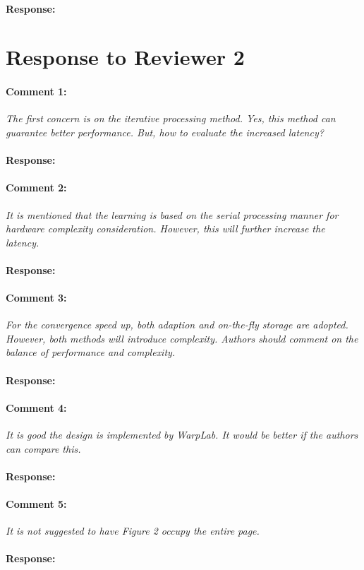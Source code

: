 \documentclass[]{article}
\begin{document}
\paragraph{Response:}
	

\section{Response to Reviewer 2}
\paragraph{Comment 1:}\textit{The first concern is on the iterative processing method. Yes, this method can guarantee better performance. But, how to evaluate the increased latency?}
\paragraph{Response:}

\paragraph{Comment 2:}\textit{It is mentioned that the learning is based on the serial processing manner for hardware complexity consideration. However, this will further increase the latency.}
\paragraph{Response:}
	
\paragraph{Comment 3:}\textit{For the convergence speed up, both adaption and on-the-fly storage are adopted. However, both methods will introduce complexity. Authors should comment on the balance of performance and complexity.}
\paragraph{Response:}
	
\paragraph{Comment 4:}\textit{It is good the design is implemented by WarpLab. It would be better if the authors can compare this.}
\paragraph{Response:}
\paragraph{Comment 5:}\textit{It is not suggested to have Figure 2 occupy the entire page.}
\paragraph{Response:}
				
\end{document}
